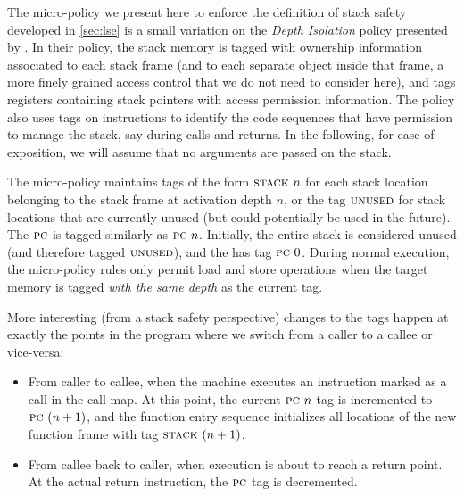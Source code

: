 \documentclass[acmsmall,review,anonymous]{acmart}\settopmatter{printfolios=true,printccs=false,printacmref=false}
\begin{document}

The micro-policy we present here to enforce the definition of stack
safety developed in \cref{sec:lse} is a small variation
on the {\em Depth Isolation} policy presented by
\citet{DBLP:conf/sp/RoesslerD18}. In their policy,  the stack memory is tagged
with ownership information associated to each stack frame (and to each
separate object inside that frame, a more finely grained access
control that we do not need to consider here), and tags registers containing
stack pointers with access permission information. The policy also
uses tags on instructions to identify the code
sequences that have permission to manage the stack, say during calls and returns.
In the following, for ease of exposition, we will assume that no
arguments are passed on the stack.

The micro-policy maintains tags of the form $\textsc{stack} ~ n$ for
each stack location belonging to the stack frame at activation depth
$n$, or the tag $\textsc{unused}$ for stack locations that are currently
unused (but could potentially be used in the future).
%
The $\textsc{pc}$ is tagged similarly as $\textsc{pc} ~ n$.
%
Initially, the entire stack is considered unused (and therefore tagged
$\textsc{unused}$), and the {\PCname} has tag $\textsc{pc} ~ 0$.
%
During normal execution, the micro-policy rules only permit load and
store operations when the target memory is tagged {\em with the same
  depth} as the current {\PCname} tag.


More interesting (from a stack safety perspective) changes to the tags
happen at exactly the points in the program where we switch from a
caller to a callee or vice-versa:

\begin{itemize}

\item From caller to callee, when the machine executes an instruction marked as a call in
  the call map.
  At this point, the current
  $\textsc{pc} ~ n$ tag is incremented to $\textsc{pc} ~ (n + 1)$, and the function
  entry sequence initializes  all locations of the new function frame with
  tag $\textsc{stack} ~ (n + 1)$.

\item From callee back to caller, when execution is about to reach a
  return point.
  At the actual return instruction,
  the $\textsc{pc}$ tag is decremented.

\end{itemize}
\end{document}
